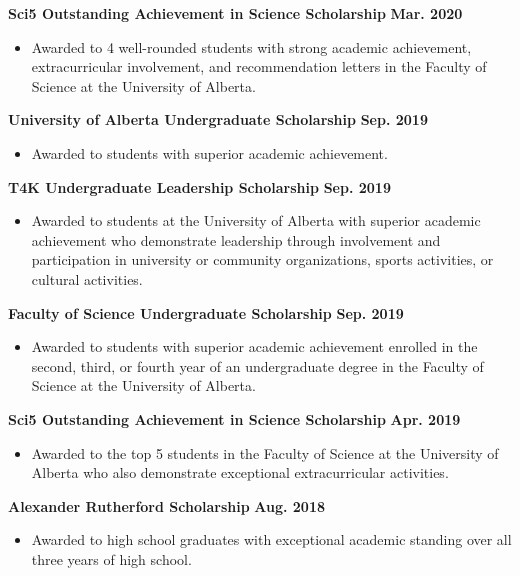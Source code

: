 \documentclass{article}
\begin{document}
\textbf{Sci5 Outstanding Achievement in Science Scholarship} \hfill \textbf{Mar. 2020}
\begin{itemize}
    \item Awarded to 4 well-rounded students with strong academic achievement, extracurricular involvement, and recommendation letters in the Faculty of Science at the University of Alberta.
\end{itemize}

\textbf{University of Alberta Undergraduate Scholarship} \hfill \textbf{Sep. 2019}
    \begin{itemize}
        \item Awarded to students with superior academic achievement.
    \end{itemize}

\textbf{T4K Undergraduate Leadership Scholarship} \hfill \textbf{Sep. 2019}
    \begin{itemize}
        \item Awarded to students at the University of Alberta with superior academic achievement who demonstrate leadership through involvement and participation in university or community organizations, sports activities, or cultural activities.
    \end{itemize}

\textbf{Faculty of Science Undergraduate Scholarship} \hfill \textbf{Sep. 2019}
    \begin{itemize}
        \item Awarded to students with superior academic achievement enrolled in the second, third, or fourth year of an undergraduate degree in the Faculty of Science at the University of Alberta.
    \end{itemize}

\textbf{Sci5 Outstanding Achievement in Science Scholarship} \hfill \textbf{Apr. 2019}
    \begin{itemize}
        \item Awarded to the top 5 students in the Faculty of Science at the University of Alberta who also demonstrate exceptional extracurricular activities.
    \end{itemize}

\textbf{Alexander Rutherford Scholarship} \hfill \textbf{Aug. 2018}
    \begin{itemize}
        \item Awarded to high school graduates with exceptional academic standing over all three years of high school.
    \end{itemize}
\end{document}
